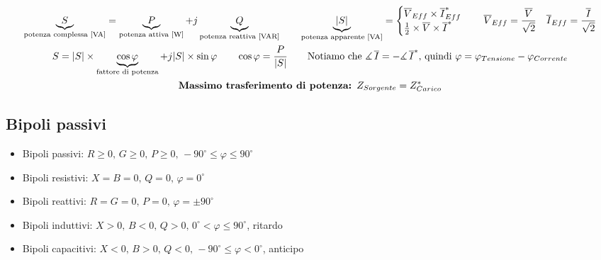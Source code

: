 \documentclass[10pt]{article}
\renewcommand{\deg}{^{\circ}}
\begin{document}
        \begin{gather*}
            \underbrace{S}_{\text{potenza complessa [VA]}} = \underbrace{P}_{\text{potenza attiva [W]}} + j \underbrace{Q}_{\text{potenza reattiva [VAR]}} \qquad
                \underbrace{|S|}_{\text{potenza apparente [VA]}} =
                    \begin{cases}
                        \overline{V}_{Eff} \times \overline{I}^*_{Eff}\\
                        \frac{1}{2} \times \overline{V} \times \overline{I}^*
                    \end{cases}
                \quad \overline{V}_{Eff} = \frac{\overline{V}}{\sqrt{2}} \quad \overline{I}_{Eff} = \frac{\overline{I}}{\sqrt{2}}\\
                S = |S| \times \underbrace{\cos \varphi}_{\text{fattore di potenza}} + j |S| \times \sin \varphi \qquad \cos \varphi = \frac{P}{|S|} \qquad \text{Notiamo che } \measuredangle \, \overline{I} = - \measuredangle \, \overline{I}^* \text{, quindi } \varphi = \varphi_{Tensione} - \varphi_{Corrente}\\
                \text{\textbf{Massimo trasferimento di potenza: }} Z_{Sorgente} = Z^*_{Carico}
            \end{gather*}

    \vspace{-2\baselineskip}
    \subsection*{Bipoli passivi}
    \vspace{-.5\baselineskip}

        \begin{minipage}[t]{.45\textwidth}
            \begin{itemize}
                \item Bipoli passivi: \(R \geqslant 0,\, G \geqslant 0,\, P \geqslant 0,\, -90\deg \leqslant \varphi \leqslant 90\deg\)
                \item Bipoli resistivi: \(X=B=0,\, Q=0,\, \varphi=0\deg\)
                \item Bipoli reattivi: \(R=G=0,\, P=0,\, \varphi=\pm90\deg\)
            \end{itemize}
        \end{minipage}
        \hfill
        \begin{minipage}[t]{.55\textwidth}
            \begin{itemize}
                \item Bipoli induttivi: \(X > 0,\, B<0,\, Q>0,\, 0\deg < \varphi \leqslant 90\deg\), ritardo
                \item Bipoli capacitivi: \(X<0,\, B>0,\, Q<0,\, -90\deg \leqslant \varphi < 0\deg\), anticipo
            \end{itemize}
        \end{minipage}
\end{document}
